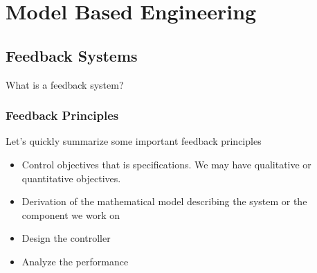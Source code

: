 \chapter{Model Based Engineering}
\label{model_based_eng}


\section{Feedback Systems}
What is a feedback system?


\subsection{Feedback Principles}
Let's quickly summarize some important feedback principles


\begin{itemize}

\item Control objectives that is specifications. We may have qualitative or quantitative objectives.
\item Derivation of the mathematical model describing the system or the component we work on
\item Design the controller
\item Analyze the performance
\end{itemize}







